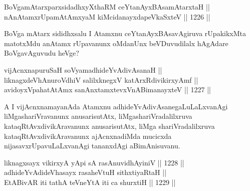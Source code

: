 \begin{shl}
\footnotemark[2]BoVgamAtarxparxsidadhxyXthaRM ceYtanAyxBAsamAtarxtaH ||  \\
nAnAtamxrUpamAtAmx\s yaM kiMcidanayxdapeVkaSxteV \hfill || 1226 ||  
\end{shl}

\begin{artha}
BoVga mAtarx sididhxsalu I Atamxnu ceYtanAyxBAsavAgiruva rUpakikxMta matotxMdu anAtamx rUpavanunx oMdanUnx beVDuvudilalx hAgAdare BoVgavAguvudu heVge?
\end{artha}

\begin{shl}
vijAcnxnapuruSaH soV\s yamadhideYvAdivAsanaH || \\
liknagxdeVhAnuroVdhiV salilxknegxV katArxRdivikirxyAmf || \\
avidoyxVpahatAtAmx sanAnxtamxtevxVnABimanayxteV \hfill || 1227 ||  
\end{shl}

\begin{artha}
A I vijAcnxnamayanAda Atamxnu adhideYvAdivAsanegaLuLaLxvanAgi liMgashariVravanunx anusarisutAtx, liMgashariVradalilxruva kataqRtAvxdivikAravanunx anusarisutAtx, liMga shariVradalilxruva kataqRtAvxdivikAravanunx ajAcnxnadiMda mucicxda nijasavxrUpavuLaLxvanAgi tananxdAgi aBimAnisuvanu.
\end{artha}



\begin{shl}
liknagxsayx vikirxyA yA\s pi sA rasAnuvidhAyiniV \hfill || 1228 ||  \\
adhideYvAdideVhasayx rasaheVtuH sithxtiyaRtaH || \\
EtABivAR iti tathA teVneYtA iti ca shurxtiH \hfill || 1229 ||  
\end{shl}

